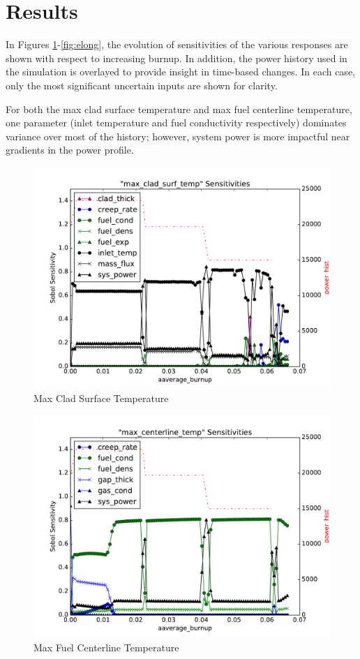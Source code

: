 \documentclass{anstrans} \usepackage{amsmath} \usepackage{amssymb}
\begin{document}
\section{Results}\label{results}
In Figures \ref{fig:pct}-\ref{fig:elong}, the evolution of sensitivities of the various responses are shown
with respect to increasing burnup.  In addition, the power history used in the simulation is overlayed to
provide insight in time-based changes.  In each case, only the most significant uncertain inputs are shown
for clarity.

For both the max clad surface temperature and max fuel centerline temperature, one parameter (inlet
temperature and fuel conductivity respectively) dominates variance over most of the history; however, system
power is more impactful near gradients in the power profile.
\begin{figure}[H]
  \centering
  \includegraphics[width=\linewidth]{./sens_max_clad_surf_temp}
  \caption{Max Clad Surface Temperature}
  \label{fig:pct}
\end{figure}
\begin{figure}[H]
  \centering
  \includegraphics[width=\linewidth]{./sens_max_centerline_temp}
  \caption{Max Fuel Centerline Temperature}
  \label{fig:centerline}
\end{figure}
\end{document}
